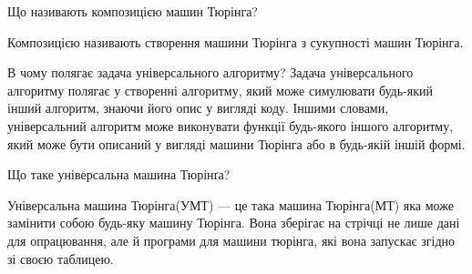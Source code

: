 \documentclass[a4paper, 12pt, oneside]{extarticle}
\begin{document}
\begin{itemize}
	\question Що називають композицією машин Тюрінга?

	\answer Композицією називають створення машини Тюрінга з сукупності машин Тюрінга.

	\question В чому полягає задача універсального алгоритму?
	\answer Задача універсального алгоритму полягає у створенні алгоритму, який може симулювати будь-який інший алгоритм, знаючи його опис у вигляді коду. Іншими словами, універсальний алгоритм може виконувати функції будь-якого іншого алгоритму, який може бути описаний у вигляді машини Тюрінга або в будь-якій іншій формі.

	\question Що таке універсальна машина Тюрінґа?

\answer Універсальна машина Тюрінга(УМТ) --- це така машина Тюрінга(МТ)
яка може замінити собою будь-яку машину Тюрінга. Вона зберігає на стрічці
не лише дані для опрацювання, але й програми для машини тюрінга, які вона запускає згідно зі своєю таблицею.

\end{itemize}
\end{document}
